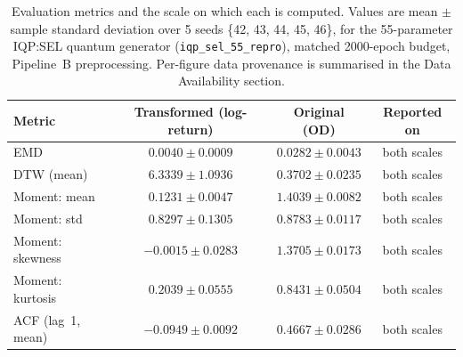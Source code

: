 \documentclass[12pt,twocolumn]{article}
\begin{document}
\begin{table}[!htbp]
\centering
\caption{Evaluation metrics and the scale on which each is computed. Values
are mean $\pm$ sample standard deviation over 5 seeds \{42, 43, 44, 45, 46\},
for the 55-parameter IQP:SEL quantum generator (\texttt{iqp\_sel\_55\_repro}),
matched 2000-epoch budget, Pipeline~B preprocessing. Per-figure data
provenance is summarised in the Data Availability section.}
\label{tbl:eval_scale}
\small
\begin{tabular}{@{}lccc@{}}
\toprule
\textbf{Metric} & \textbf{Transformed (log-return)} & \textbf{Original (OD)} & \textbf{Reported on} \\
\midrule
EMD                 & $0.0040 \pm 0.0009$  & $0.0282 \pm 0.0043$ & both scales \\
DTW (mean)          & $6.3339 \pm 1.0936$  & $0.3702 \pm 0.0235$ & both scales \\
Moment: mean        & $0.1231 \pm 0.0047$  & $1.4039 \pm 0.0082$ & both scales \\
Moment: std         & $0.8297 \pm 0.1305$  & $0.8783 \pm 0.0117$ & both scales \\
Moment: skewness    & $-0.0015 \pm 0.0283$ & $1.3705 \pm 0.0173$ & both scales \\
Moment: kurtosis    & $0.2039 \pm 0.0555$  & $0.8431 \pm 0.0504$ & both scales \\
ACF (lag~1, mean)   & $-0.0949 \pm 0.0092$ & $0.4667 \pm 0.0286$ & both scales \\
\bottomrule
\end{tabular}
\end{table}
\end{document}
